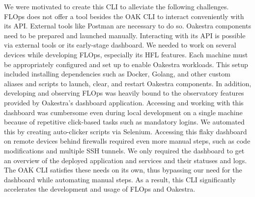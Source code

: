 We were motivated to create this CLI to alleviate the following challenges.
FLOps does not offer a tool besides the OAK CLI to interact conveniently with its API.
External tools like Postman are necessary to do so.
Oakestra components need to be prepared and launched manually.
Interacting with its API is possible via external tools or its early-stage dashboard.
We needed to work on several devices while developing FLOps, especially its HFL features.
Each machine must be appropriately configured and set up to enable Oakestra workloads.
This setup included installing dependencies such as Docker, Golang, and other custom aliases and scripts to launch, clear, and restart Oakestra components.
In addition, developing and observing FLOps was heavily bound to the observatory features provided by Oakestra's dashboard application.
Accessing and working with this dashboard was cumbersome even during local development on a single machine because of repetitive click-based tasks such as mandatory logins.
We automated this by creating auto-clicker scripts via Selenium.
Accessing this flaky dashboard on remote devices behind firewalls required even more manual steps, such as code modifications and multiple SSH tunnels.
We only required the dashboard to get an overview of the deployed application and services and their statuses and logs.
The OAK CLI satisfies these needs on its own, thus bypassing our need for the dashboard while automating manual steps.
As a result, this CLI significantly accelerates the development and usage of FLOps and Oakestra.






